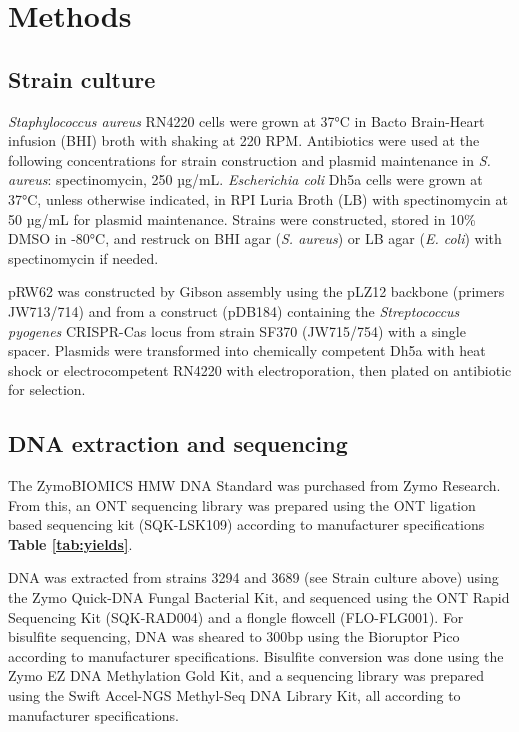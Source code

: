 \section{Methods}
\label{sec:methods}

\subsection{Strain culture}
\label{sec:methods}

\textit{Staphylococcus aureus} RN4220 cells were grown at 37°C in Bacto Brain-Heart infusion (BHI) broth with shaking at 220 RPM. Antibiotics were used at the following concentrations for strain construction and plasmid maintenance in \textit{S. aureus}: spectinomycin, 250 µg/mL. \textit{Escherichia coli} Dh5a cells were grown at 37°C, unless otherwise indicated, in RPI Luria Broth (LB) with spectinomycin at 50 µg/mL for plasmid maintenance. Strains were constructed, stored in 10\% DMSO in -80°C, and restruck on BHI agar (\textit{S. aureus}) or LB agar (\textit{E. coli}) with spectinomycin if needed.

pRW62 was constructed by Gibson assembly using the pLZ12 backbone (primers JW713/714) and from a construct (pDB184) containing the \textit{Streptococcus pyogenes} CRISPR-Cas locus from strain SF370 (JW715/754) with a single spacer. Plasmids were transformed into chemically competent Dh5a with heat shock or electrocompetent RN4220 with electroporation, then plated on antibiotic for selection.

\subsection{DNA extraction and sequencing}
\label{sec:methods}

The ZymoBIOMICS HMW DNA Standard was purchased from Zymo Research. From this, an ONT sequencing library was prepared using the ONT ligation based sequencing kit (SQK-LSK109) according to manufacturer specifications {\bf Table \ref{tab:yields}}.

DNA was extracted from strains 3294 and 3689 (see Strain culture above) using the Zymo Quick-DNA Fungal Bacterial Kit, and sequenced using the ONT Rapid Sequencing Kit (SQK-RAD004) and a flongle flowcell (FLO-FLG001). For bisulfite sequencing, DNA was sheared to 300bp using the Bioruptor Pico according to manufacturer specifications. Bisulfite conversion was done using the Zymo EZ DNA Methylation Gold Kit, and a sequencing library was prepared using the Swift Accel-NGS Methyl-Seq DNA Library Kit, all according to manufacturer specifications.

